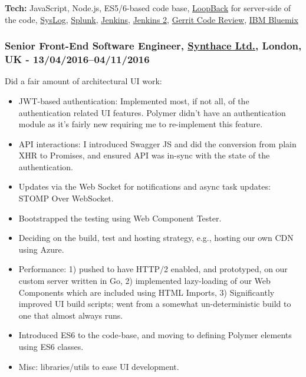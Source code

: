 \documentclass[
  a4paper,
]{article}
\providecommand{\tightlist}{%
  \setlength{\itemsep}{0pt}\setlength{\parskip}{0pt}}
\begin{document}
\begin{multicols*}{2}
\textbf{Tech:} JavaScript, Node.js, ES5/6-based code base,
\href{https://loopback.io}{LoopBack} for server-side of the code,
\href{https://en.wikipedia.org/wiki/Syslog}{SysLog},
\href{http://www.splunk.com}{Splunk},
\href{https://www.jenkins.io}{Jenkins},
\href{https://www.jenkins.io/2.0}{Jenkins 2},
\href{https://www.gerritcodereview.com/}{Gerrit Code Review},
\href{https://en.wikipedia.org/wiki/Bluemix}{IBM Bluemix}

\hypertarget{senior-front-end-software-engineer-synthace-ltd.-london-uk---1304201604112016}{%
\subsubsection{\texorpdfstring{Senior Front-End Software Engineer,
\href{https://synthace.com}{Synthace Ltd.}, London, UK -
13/04/2016--04/11/2016}{Senior Front-End Software Engineer, Synthace Ltd., London, UK - 13/04/2016--04/11/2016}}\label{senior-front-end-software-engineer-synthace-ltd.-london-uk---1304201604112016}}

Did a fair amount of architectural UI work:

\begin{itemize}
\tightlist
\item
  JWT-based authentication: Implemented most, if not all, of the
  authentication related UI features. Polymer didn't have an
  authentication module as it's fairly new requiring me to re-implement
  this feature.
\item
  API interactions: I introduced Swagger JS and did the conversion from
  plain XHR to Promises, and ensured API was in-sync with the state of
  the authentication.
\item
  Updates via the Web Socket for notifications and async task updates:
  STOMP Over WebSocket.
\item
  Bootstrapped the testing using Web Component Tester.
\item
  Deciding on the build, test and hosting strategy, e.g., hosting our
  own CDN using Azure.
\item
  Performance: 1) pushed to have HTTP/2 enabled, and prototyped, on our
  custom server written in Go, 2) implemented lazy-loading of our Web
  Components which are included using HTML Imports, 3) Significantly
  improved UI build scripts; went from a somewhat un-deterministic build
  to one that almost always runs.
\item
  Introduced ES6 to the code-base, and moving to defining Polymer
  elements using ES6 classes.
\item
  Misc: libraries/utils to ease UI development.
\end{itemize}


\end{multicols*}
\end{document}
